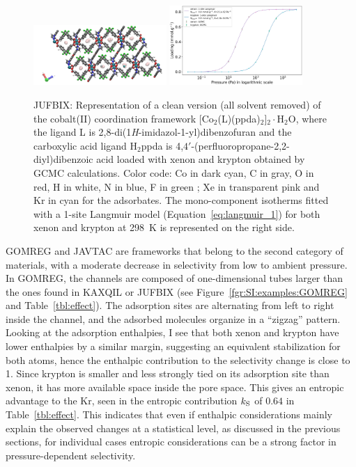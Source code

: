 \documentclass[main.tex]{subfiles}
\begin{document}
\begin{figure}[ht]
  \centering
    \includegraphics[width=0.45\textwidth]{figures/2-thermo/JUFBIX_clean.jpg}
    \includegraphics[width=0.45\textwidth]{figures/2-thermo/JUFBIX_clean_isotherm_xenon_krypton_298K.jpg}
    \caption{JUFBIX: Representation of a clean version (all solvent removed) of the cobalt(II) coordination framework [Co$_2$(L)(ppda)$_2$]$_2\cdot$H$_2$O, where the ligand L is 2,8-di(1\emph{H}-imidazol-1-yl)dibenzofuran and the carboxylic acid ligand H$_2$ppda is 4,$4'$-(perfluoropropane-2,2-diyl)dibenzoic acid loaded with xenon and krypton obtained by GCMC calculations. Color code: Co in dark cyan, C in gray, O in red, H in white, N in blue, F in green ; Xe in transparent pink and Kr in cyan for the adsorbates. The mono-component isotherms fitted with a 1-site Langmuir model (Equation~\ref{eq:langmuir_1}) for both xenon and krypton at \SI{298}{\kelvin} is represented on the right side.}\label{fgr:SI:examples:JUFBIX}
  \end{figure}

GOMREG and JAVTAC are frameworks that belong to the second category of materials, with a moderate decrease in selectivity from low to ambient pressure. In GOMREG, the channels are composed of one-dimensional tubes larger than the ones found in KAXQIL or JUFBIX (see Figure~\ref{fgr:SI:examples:GOMREG} and Table~\ref{tbl:effect}). The adsorption sites are alternating from left to right inside the channel, and the adsorbed molecules organize in a ``zigzag'' pattern. Looking at the adsorption enthalpies, I see that both xenon and krypton have lower enthalpies by a similar margin, suggesting an equivalent stabilization for both atoms, hence the enthalpic contribution to the selectivity change is close to 1.
Since krypton is smaller and less strongly tied on its adsorption site than xenon, it has more available space inside the pore space. This gives an entropic advantage to the Kr, seen in the entropic contribution $k_{\text{S}}$ of $0.64$ in Table~\ref{tbl:effect}. This indicates that even if enthalpic considerations mainly explain the observed changes at a statistical level, as discussed in the previous sections, for individual cases entropic considerations can be a strong factor in pressure-dependent selectivity.
\end{document}
